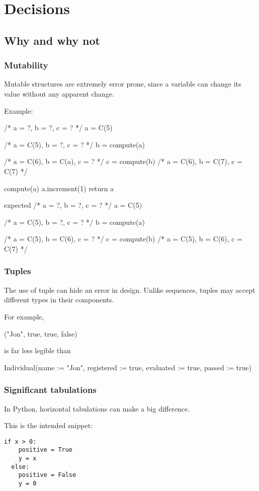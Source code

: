 \chapter{Decisions}

\section{Why and why not}

\subsection{Mutability}
Mutable structures are extremely error prone, since a variable can change its value without any apparent change.

Example:

/* a = ?, b = ?, c = ? */
a = C(5)

/* a = C(5), b = ?, c = ? */
b = compute(a)

/* a = C(6), b = C(a), c = ? */
c = compute(b)
/* a = C(6), b = C(7), c = C(7) */


compute(a)
a.increment(1)
return a


expected
/* a = ?, b = ?, c = ? */
a = C(5)

/* a = C(5), b = ?, c = ? */
b = compute(a)

/* a = C(5), b = C(6), c = ? */
c = compute(b)
/* a = C(5), b = C(6), c = C(7) */

\subsection{Tuples}

The use of tuple can hide an error in design.
Unlike sequences, tuples may accept different types in their components.

For example,

("Jon", true, true, false)

is far less legible than

Individual(name := "Jon", registered := true, evaluated := true, passed := true)

\subsection{Significant tabulations}

In Python, horizontal tabulations can make a big difference.

This is the intended snippet:

\begin{lstlisting}[label={lst:snippetInPython1}]
  if x > 0:
    positive = True
    y = x
  else:
    positive = False
    y = 0
\end{lstlisting}


